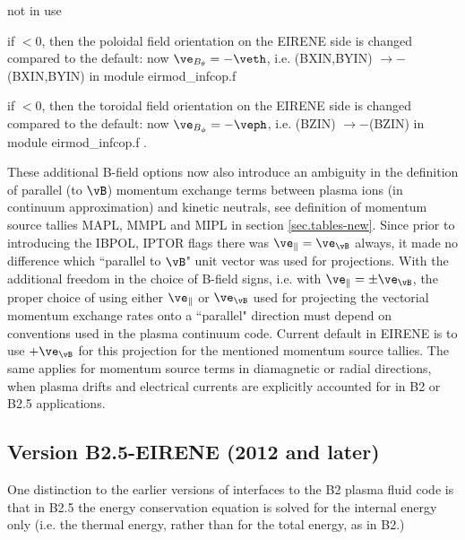 \begin{list}{ }{}
\item[{\bf IBRAD}]
not in use
\item[{\bf IBPOL}]
if $< 0$, then the poloidal field orientation on the EIRENE side is changed compared to the default: now $\ve_{B_\theta} = -\veth$,
i.e. (BXIN,BYIN) $\rightarrow - $(BXIN,BYIN) in module eirmod\_infcop.f
\item[{\bf IBTOR}]
if $< 0$, then the toroidal field orientation on the EIRENE side is changed compared to the default: now $\ve_{B_\phi} = -\veph$,
i.e. (BZIN) $\rightarrow - $(BZIN) in module eirmod\_infcop.f .
\end{list}

These additional B-field options now also introduce an ambiguity in the definition of parallel (to $\vB$) momentum exchange terms
between plasma ions (in continuum approximation) and kinetic neutrals, see definition of momentum source tallies MAPL, MMPL and MIPL
in section \ref{sec.tables-new}. Since prior to introducing the IBPOL, IPTOR flags there was  $\ve_\| = \ve_{\vB}$ always,
it made no difference which ``parallel to $\vB$" unit vector was used for
projections. With the additional freedom in the choice of B-field signs, i.e. with $\ve_\| = \pm \ve_{\vB}$, the proper choice of using either
$\ve_\|$ or $\ve_{\vB}$ used for projecting
the vectorial momentum exchange rates onto a ``parallel" direction must depend on conventions used in the plasma continuum code. Current default in EIRENE is
to use $+\ve_{\vB}$ for this projection for the mentioned momentum source tallies. The same applies for momentum source terms
in diamagnetic or radial directions, when plasma drifts and electrical currents are explicitly accounted for in B2 or B2.5 applications.


\subsection{Version B2.5-EIRENE (2012 and later)} \label{sec2.14.4}
\medskip

One distinction to the earlier versions of interfaces to the B2 plasma fluid code is that in B2.5
the energy conservation equation is solved for the internal energy only (i.e. the thermal energy, rather than for the total energy, as in B2.)

